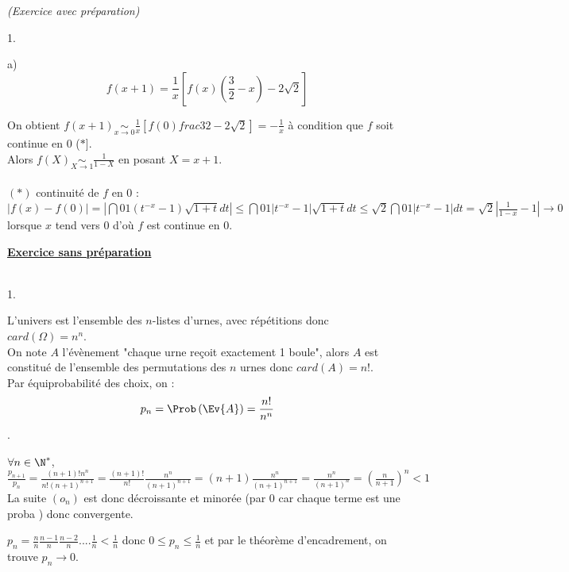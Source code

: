 \documentclass[11pt]{article}%
\begin{document}
\begin{exercice}{\it (Exercice avec préparation)}
\begin{noliste}{1.}
\begin{noliste}{a)}
\[
 f(x + 1) = \frac{1}{x}[f(x)(\frac{3}{2}-x)-2\sqrt{2}]
\]
 \item On obtient $f(x + 1)\underset{x \to 0}{\sim}
\frac{1}{x}[f(0)frac{3}{2}-2\sqrt{2}] = -\frac{1}{x}$ à condition que
$f$ soit continue en 0 ($\ast$].\\
 Alors $f(X) \underset{X \to 1}{\sim} \frac{1}{1-X}$ en posant $X = x +
1$. \\
\\
 $(\ast) $ continuité de $f$ en 0 : \\
 $|f(x)-f(0)| = \left| \dint{0}{1} (t^{-x}-1) \sqrt{1 + t}dt\right|
\leq \dint{0}{1} |t^{-x}-1|\sqrt{1 + t}dt \leq \sqrt{2}
\dint{0}{1}|t^{-x}-1|dt = \sqrt{2} | \frac{1}{1-x}-1| \to 0$ lorsque
$x$ tend vers 0 d'où $f$ est continue en 0.
 \end{noliste}
 \item
 \end{noliste}
 \textbf{\underline{Exercice sans préparation}} \\
\\
 \begin{noliste}{1.}
 \setlength{\itemsep}{4mm}
 \item L'univers est l'ensemble des $n$-listes d'urnes, avec
répétitions donc $card(\Omega) = n^{n}$. \\
 On note $A$ l'évènement "chaque urne reçoit exactement 1 boule", alors
$A$ est constitué de l'ensemble des permutations des $n$ urnes donc
$card(A) = n!$. \\
 Par équiprobabilité des choix, on : \\
 
\[
 p_{n} = \Prob\left(\Ev{A}\right) = \frac{n!}{n^{n}}
\]. 
 \item $\forall n \in \N^*$, $\frac{p_{n + 1}}{p_{n}} = \frac{(n +
1)!n^{n}}{n! (n + 1)^{n + 1}} = \frac{(n + 1)!}{n!} \frac{n^{n}}{(n +
1)^{n + 1}} = (n + 1) \frac{n^{n}}{(n + 1)^{n + 1}} = \frac{n^{n}}{(n +
1)^{n}} = \left(\frac{n}{n + 1} \right)^{n}<1$ \\
 La suite $(o_{n})$ est donc décroissante et minorée (par 0 car chaque
terme est une proba ) donc convergente.
 \item $p_{n} = \frac{n}{n} \frac{n-1}{n} \frac{n-2}{n}....\frac{1}{n}
< \frac{1}{n} $ donc $0 \leq p_{n} \leq \frac{1}{n}$ et par le théorème
d'encadrement, on trouve $p_{n} \to 0$. 
 \end{noliste}
 \end{exercice}

 
\end{document}
